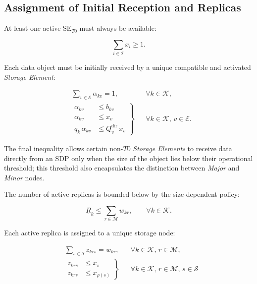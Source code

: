 \documentclass[a4paper,fleqn]{cas-dc}
\newcommand{\Iset}{\mathcal{I}}
\newcommand{\Eset}{\mathcal{E}}
\newcommand{\Sset}{\mathcal{S}}
\newcommand{\Kset}{\mathcal{K}}
\newcommand{\Mset}{\mathcal{M}}
\begin{document}
\subsection*{Assignment of Initial Reception and Replicas}

At least one active \(\mathrm{SE}_{T0}\) must always be available:

\begin{equation}
\sum_{i\in\Iset} x_i \ge 1.
\end{equation}

Each data object must be initially received by a unique compatible and activated \emph{Storage Element}:


\begin{align}
&\sum_{v\in\Eset} \alpha_{kv} = 1,
&& \forall k\in\Kset,\\[1ex]
&\left.
\begin{aligned}
\alpha_{kv} &\le b_{kv} \\
\alpha_{kv} &\le x_v \\
q_k\,\alpha_{kv} &\le Q_v^{\mathrm{dir}}\,x_v 
\end{aligned}
\right\}
&& \forall k\in\Kset,\, v\in\Eset.
\end{align}



The final inequality allows certain non-\(T0\) \emph{Storage Elements} to receive data directly from an SDP only when the size of the object lies below their operational threshold; this threshold also encapsulates the distinction between \emph{Major} and \emph{Minor} nodes.

The number of active replicas is bounded below by the size-dependent policy:

\begin{equation}
\underline R_k \le \sum_{r\in\Mset} w_{kr},
\qquad \forall k\in\Kset.
\end{equation}

Each active replica is assigned to a unique storage node:

\begin{align}
&\sum_{s\in\Sset} z_{krs} = w_{kr},
&& \forall k\in\Kset,\, r\in\Mset,\\[1ex]
&\left.
\begin{aligned}
z_{krs} &\le x_s \\
z_{krs} &\le x_{\rho(s)}
\end{aligned}
\right\}
&& \forall k\in\Kset,\, r\in\Mset,\, s\in\Sset
\end{align}
\end{document}
